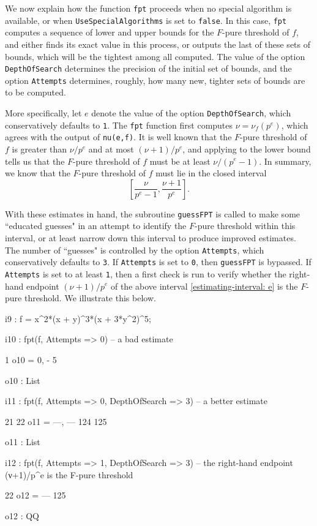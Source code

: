\documentclass{amsart}
\begin{document}
We now explain how the function  \texttt{fpt} proceeds when no special algorithm is available, or when \texttt{UseSpecialAlgorithms} is set to \texttt{false}.
In this case, \texttt{fpt} computes a sequence of lower and upper bounds for the $F$-pure threshold of $f$, and either finds its exact value in this process, or outputs the last of these sets of bounds, which will be the tightest among all computed.
The value of the option \texttt{DepthOfSearch} determines the precision of the initial set of bounds, and the option \texttt{Attempts} determines, roughly, how many new, tighter sets of bounds are to be computed.

More specifically, let $e$ denote the value of the option \texttt{DepthOfSearch}, which conservatively defaults to \texttt{1}.
The \texttt{fpt} function first computes $\nu=\nu_f(p^e)$, which agrees with the output of \texttt{nu(e,f)}.
It is well known that the $F$-pure threshold of $f$ is greater than $\nu/p^e$ and at most $(\nu+1)/p^e$, and applying  \cite[Proposition~4.2]{HernandezFPurityOfHypersurfaces} to the lower bound tells us that the $F$-pure threshold of $f$ must be at least $\nu/(p^e-1)$.
In summary, we know that the $F$-pure threshold of $f$ must lie in the closed interval
%
\begin{equation}
\label{estimating-interval: e}
\tag{$\dagger$}
\left[ \frac{\nu}{p^e-1}, \frac{\nu+1}{p^e} \right].
\end{equation}

With these estimates in hand, the subroutine \texttt{guessFPT} is called to make some ``educated guesses" in an attempt to identify the $F$-pure threshold within this interval, or at least narrow down this interval to produce improved estimates.  The number of ``guesses" is controlled by the option \texttt{Attempts}, which conservatively defaults to \texttt{3}.  If \texttt{Attempts} is set to \texttt{0}, then \texttt{guessFPT} is bypassed. If  \texttt{Attempts} is set to at least \texttt{1}, then a first check is run to verify whether the right-hand endpoint $(\nu+1)/p^e$ of the above interval \eqref{estimating-interval: e} is the $F$-pure threshold.  We illustrate this below.

\smallskip
{\small
{}
\begin{MyVerbatim}
i9 : f = x^2*(x + y)^3*(x + 3*y^2)^5;

i10 : fpt(f, Attempts => 0) -- a bad estimate

          1
o10 = {0, -}
          5

o10 : List

i11 : fpt(f, Attempts => 0, DepthOfSearch => 3) -- a better estimate

        21   22
o11 = {---, ---}
       124  125

o11 : List

i12 : fpt(f, Attempts => 1, DepthOfSearch => 3) -- the right-hand endpoint
      (ν+1)/p^e is the F-pure threshold

       22
o12 = ---
      125

o12 : QQ
\end{MyVerbatim}
}
\smallskip
\end{document}
